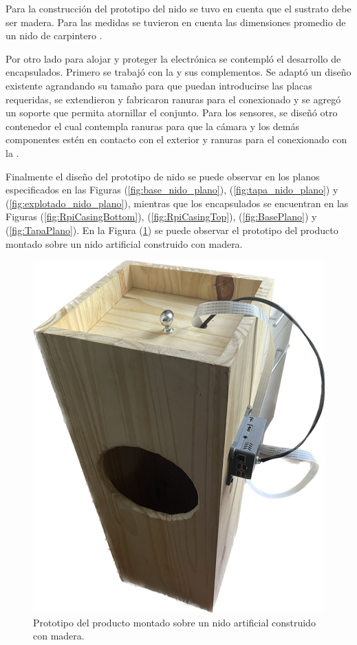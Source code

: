 Para la construcción del prototipo del nido se tuvo en cuenta que el sustrato debe ser madera. Para las medidas se tuvieron en cuenta las dimensiones promedio de un nido de carpintero \cite{ref:PaperValeriaOjeda}.

Por otro lado para alojar y proteger la electrónica se contempló el desarrollo de encapsulados. Primero se trabajó con la \rspi y sus complementos. Se adaptó un diseño existente agrandando su tamaño para que puedan introducirse las placas requeridas, se extendieron y fabricaron ranuras para el conexionado y se agregó un soporte que permita atornillar el conjunto. Para los sensores, se diseñó otro contenedor el cual contempla ranuras para que la cámara y los demás componentes estén en contacto con el exterior y ranuras para el conexionado con la \rpi.

Finalmente el diseño del prototipo de nido se puede observar en los planos especificados en las Figuras (\ref{fig:base_nido_plano}), (\ref{fig:tapa_nido_plano}) y (\ref{fig:explotado_nido_plano}), mientras que los encapsulados se encuentran en las Figuras (\ref{fig:RpiCasingBottom}), (\ref{fig:RpiCasingTop}), (\ref{fig:BasePlano}) y (\ref{fig:TapaPlano}). En la Figura (\ref{fig:caja_prototipo}) se puede observar el prototipo del producto montado sobre un nido artificial construido con madera.

\begin{figure}[H]
	\centering	\includegraphics[width=0.6\linewidth,page=1]{ImagenesConstruccion del prototipo/caja_prototipo}		
	\caption{Prototipo del producto montado sobre un nido artificial construido con madera.}
	\label{fig:caja_prototipo}
\end{figure}

